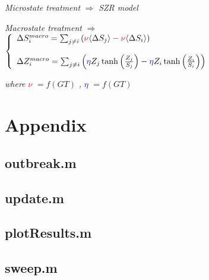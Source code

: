 \documentclass[11pt]{article} %
\begin{document}
\bigskip

\textit{Microstate treatment} $\Rightarrow$ \textit{SZR model} 

\bigskip

\textit{Macrostate treatment} $\Rightarrow$  $\left\{
	\begin{array}{l l}
		\Delta S_{i}^{macro} =  \sum_{j\neq i}{ \left( \textcolor{red}{\nu} \langle \Delta S_{j} \rangle - \textcolor{red}{\nu}  \langle \Delta S_{i} \rangle \right) }	
    \\
    \\
    		\Delta Z_{i}^{macro} = \sum_{j\neq i}{\left( \textcolor{blue}{\eta} Z_{j}\tanh \left( \frac{Z_{j}}{S_{j}}\right) -\textcolor{blue}{\eta} Z_{i}\tanh \left( \frac{Z_{i}}{S_{i}}\right) \right)}

	\end{array} \right.$

\bigskip

\textit{where} \textcolor{red}{$\nu$} $= f(GT)$ \textit{,} \textcolor{blue}{$\eta$} $= f(GT)$  

\newpage

\nocite{bennett1995modelling, balcan2011phase, funk2010modelling, reluga2010game, reluga2009sis, munz2009zombies, drezner}

\newpage

\section{Appendix}

\subsection{outbreak.m}

\bigskip
\bigskip
\bigskip

\subsection{update.m}

\bigskip
\bigskip
\bigskip

\subsection{plotResults.m}

\bigskip
\bigskip
\bigskip

\subsection{sweep.m}

\end{document}
